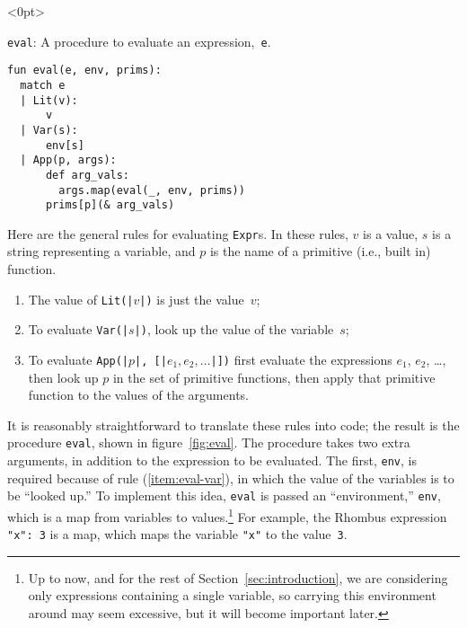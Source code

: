 \documentclass[11pt, a4paper]{article}
\newcommand{\cd}[1]{\texttt{#1}}
\begin{document}
\begin{marginfigure}<0pt>
  \caption[Eval procedure]{\cd{eval}: A procedure to evaluate an
    expression,~\cd{e}.\label{fig:eval}}
\footnotesize
\begin{verbatim}
fun eval(e, env, prims):
  match e
  | Lit(v):         
      v
  | Var(s):         
      env[s]
  | App(p, args):
      def arg_vals:
        args.map(eval(_, env, prims))
      prims[p](& arg_vals)
\end{verbatim}
\end{marginfigure}
Here are the general rules for evaluating \cd{Expr}s. In these rules,
$v$ is a value, $s$ is a string representing a variable, and $p$ is
the name of a primitive (i.e., built in) function.
\begin{enumerate}
\item The value of \cd{Lit(|$v$|)} is just the value~$v$;
\item To evaluate \cd{Var(|$s$|)}, look up the value of the
  variable~$s$;\label{item:eval-var}
\item To evaluate \cd{App(|$p$|, [|$e_1, e_2, \dotsc$|])} first
  evaluate the expressions $e_1$, $e_2$, \dots, then look up $p$ in
  the set of primitive functions, then apply that primitive function
  to the values of the arguments.\label{item:eval-app}
\end{enumerate}
It is reasonably straightforward to translate these rules into code;
the result is the procedure \cd{eval}, shown in
figure~\ref{fig:eval}. The procedure takes two extra arguments, in
addition to the expression to be evaluated. The first, \cd{env}, is
required because of rule (\ref{item:eval-var}), in which the value of
the variables is to be ``looked up.'' To implement this idea,
\cd{eval} is passed an ``environment,'' \cd{env}, which is a map from
variables to values.\footnote{Up to now, and for the rest of
  Section~\ref{sec:introduction}, we are considering only expressions
  containing a single variable, so carrying this environment around
  may seem excessive, but it will become important later.} For
example, the Rhombus expression \cd{{"x": 3}} is a map, which maps the
variable \cd{"x"} to the value~\cd{3}.
\end{document}
